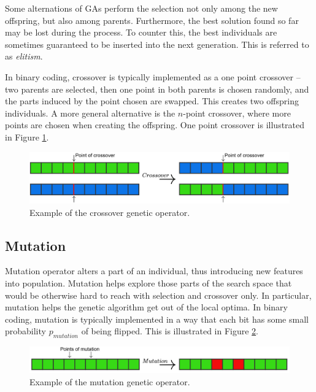 Some alternations of GAs perform the selection not only among the new offspring, but also among parents. Furthermore, the best solution found so far may be lost during the process. To counter this, the best individuals are sometimes guaranteed to be inserted into the next generation. This is referred to as \emph{elitism}.

In binary coding, crossover is typically implemented as a one point crossover – two parents are selected, then one point in both parents is chosen randomly, and the parts induced by the point chosen are swapped. This creates two offspring individuals. A more general alternative is the $n$-point crossover, where more points are chosen when creating the offspring. One point crossover is illustrated in Figure \ref{fig:crossover}.

\begin{figure}
	\includegraphics[width=14cm]{Images/crossover.png}
	\centering
	\caption{Example of the crossover genetic operator.}
	\label{fig:crossover}	
\end{figure}

\subsection{Mutation}
Mutation operator alters a part of an individual, thus introducing new features into population. Mutation helps explore those parts of the search space that would be otherwise hard to reach with selection and crossover only. In particular, mutation helps the genetic algorithm get out of the local optima.
In binary coding, mutation is typically implemented in a way that each bit has some small probability $p_{mutation}$ of being flipped. This is illustrated in Figure \ref{fig:mutation}.

\begin{figure}
	\includegraphics[width=14cm]{Images/mutation.png}
	\centering
	\caption{Example of the mutation genetic operator.}
	\label{fig:mutation}	
\end{figure}

